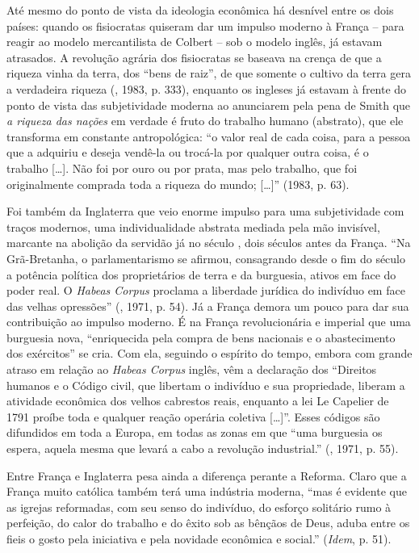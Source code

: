 Até mesmo do ponto de vista da ideologia econômica há desnível entre os
dois países: quando os fisiocratas quiseram dar um impulso moderno à
França -- para reagir ao modelo mercantilista de Colbert -- sob o modelo
inglês, já estavam atrasados. A revolução agrária dos fisiocratas se
baseava na crença de que a riqueza vinha da terra, dos ``bens de raiz'',
de que somente o cultivo da terra gera a verdadeira riqueza (,
1983, p. 333), enquanto os ingleses já estavam à frente do ponto de
vista das subjetividade moderna ao anunciarem pela pena de Smith que
\emph{a riqueza das nações} em verdade é fruto do trabalho humano
(abstrato), que ele transforma em constante antropológica: ``o valor
real de cada coisa, para a pessoa que a adquiriu e deseja vendê-la ou
trocá-la por qualquer outra coisa, é o trabalho [\ldots{}]. Não foi
por ouro ou por prata, mas pelo trabalho, que foi originalmente comprada
toda a riqueza do mundo; [\ldots{}]'' (1983, p. 63).

Foi também da Inglaterra que veio enorme impulso para uma subjetividade
com traços modernos, uma individualidade abstrata mediada pela mão
invisível, marcante na abolição da servidão já no século , dois
séculos antes da França. ``Na Grã-Bretanha, o parlamentarismo se
afirmou, consagrando desde o fim do século  a potência política dos
proprietários de terra e da burguesia, ativos em face do poder real. O
\emph{Habeas Corpus} proclama a liberdade jurídica do indivíduo em face
das velhas opressões'' (, 1971, p. 54). Já a França demora um pouco
para dar sua contribuição ao impulso moderno. É na França revolucionária
e imperial que uma burguesia nova, ``enriquecida pela compra de bens
nacionais e o abastecimento dos exércitos'' se cria. Com ela, seguindo o
espírito do tempo, embora com grande atraso em relação ao \emph{Habeas
Corpus} inglês, vêm a declaração dos ``Direitos humanos e o Código
civil, que libertam o indivíduo e sua propriedade, liberam a atividade
econômica dos velhos cabrestos reais, enquanto a lei Le Capelier de 1791
proíbe toda e qualquer reação operária coletiva [\ldots{}]''. Esses
códigos são difundidos em toda a Europa, em todas as zonas em que ``uma
burguesia os espera, aquela mesma que levará a cabo a revolução
industrial.'' (, 1971, p. 55).

Entre França e Inglaterra pesa ainda a diferença perante a Reforma.
Claro que a França muito católica também terá uma indústria moderna,
``mas é evidente que as igrejas reformadas, com seu senso do indivíduo,
do esforço solitário rumo à perfeição, do calor do trabalho e do êxito
sob as bênçãos de Deus, aduba entre os fieis o gosto pela iniciativa e
pela novidade econômica e social.'' (\emph{Idem}, p. 51).

